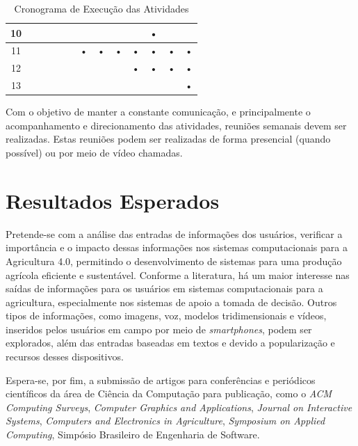 \documentclass[12pt]{article}
\begin{document}
\begin{table}[htbp]
\begin{tabular}{|c|c|c|c|c|c|c|c|c|c|c|c|c|}
	10                  &            &            &           &            &            &           &            &            &           & •          &            &           \\ \hline
	11                  &            &            &           &            &            & •         & •          & •          & •         & •          & •          & •         \\ \hline
	12                  &            &            &           &            &            &           &            &            & •         & •          & •          & •         \\ \hline
	13                  &            &            &           &            &            &           &            &            &           &            &            & •         \\ \hline
	\end{tabular}
	\caption{Cronograma de Execução das Atividades}
	\label{tab:cronograma}
\end{table}

Com o objetivo de manter a constante comunicação, e principalmente o acompanhamento e direcionamento das atividades, reuniões semanais devem ser realizadas. Estas reuniões podem ser realizadas de forma presencial (quando possível) ou por meio de vídeo chamadas.

\section{Resultados Esperados}
\label{sec:resultados_esperados}

Pretende-se com a análise das entradas de informações dos usuários, verificar a importância e o impacto dessas informações nos sistemas computacionais para a Agricultura 4.0, permitindo o desenvolvimento de sistemas para uma produção agrícola eficiente e sustentável. Conforme a literatura, há um maior interesse nas saídas de informações para os usuários em sistemas computacionais para a agricultura, especialmente nos sistemas de apoio a tomada de decisão. Outros tipos de informações, como imagens, voz, modelos tridimensionais e vídeos, inseridos pelos usuários em campo por meio de \textit{smartphones}, podem ser explorados, além das entradas baseadas em textos e devido a popularização e recursos desses dispositivos.

Espera-se, por fim, a submissão de artigos para conferências e periódicos científicos da área de Ciência da Computação para publicação, como o \textit{ACM Computing Surveys}, \textit{Computer Graphics and Applications}, \textit{Journal on Interactive Systems}, \textit{Computers and Electronics in Agriculture}, \textit{Symposium on Applied Computing}, Simpósio Brasileiro de Engenharia de Software.
\end{document}
